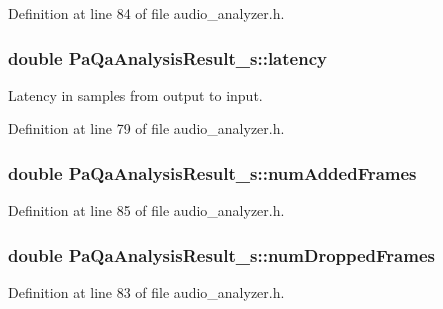 Definition at line 84 of file audio\+\_\+analyzer.\+h.

\subsubsection[{\texorpdfstring{latency}{latency}}]{\setlength{\rightskip}{0pt plus 5cm}double Pa\+Qa\+Analysis\+Result\+\_\+s\+::latency}\hypertarget{struct_pa_qa_analysis_result__s_aa01cd3b08f4331d42e541a5525b5a5ef}{}\label{struct_pa_qa_analysis_result__s_aa01cd3b08f4331d42e541a5525b5a5ef}
Latency in samples from output to input. 

Definition at line 79 of file audio\+\_\+analyzer.\+h.

\subsubsection[{\texorpdfstring{num\+Added\+Frames}{numAddedFrames}}]{\setlength{\rightskip}{0pt plus 5cm}double Pa\+Qa\+Analysis\+Result\+\_\+s\+::num\+Added\+Frames}\hypertarget{struct_pa_qa_analysis_result__s_aeb484763fda64f2ad66d30f1e7538290}{}\label{struct_pa_qa_analysis_result__s_aeb484763fda64f2ad66d30f1e7538290}


Definition at line 85 of file audio\+\_\+analyzer.\+h.

\subsubsection[{\texorpdfstring{num\+Dropped\+Frames}{numDroppedFrames}}]{\setlength{\rightskip}{0pt plus 5cm}double Pa\+Qa\+Analysis\+Result\+\_\+s\+::num\+Dropped\+Frames}\hypertarget{struct_pa_qa_analysis_result__s_adf01d50ef45ca2a38f961659b0b5e39e}{}\label{struct_pa_qa_analysis_result__s_adf01d50ef45ca2a38f961659b0b5e39e}


Definition at line 83 of file audio\+\_\+analyzer.\+h.


